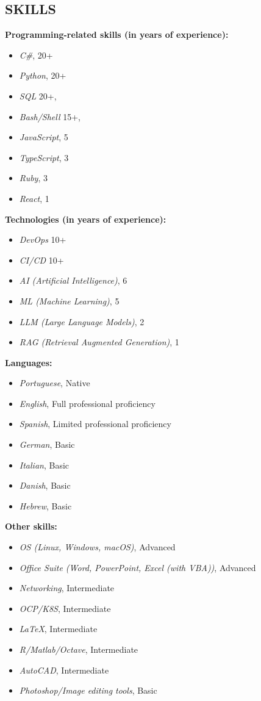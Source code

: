 \documentclass[margin]{res} %
\begin{document}
\begin{resume}
		\section{SKILLS}
		{\bf Programming-related skills (in years of experience):}
		\begin{itemize}
			\item {\sl C\#}, 20+
			\item {\sl Python}, 20+
			\item {\sl SQL} 20+,
			\item {\sl Bash/Shell} 15+,
			\item {\sl JavaScript}, 5
			\item {\sl TypeScript}, 3
			\item {\sl Ruby}, 3
			\item {\sl React}, 1
		\end{itemize}
		{\bf Technologies (in years of experience):}
		\begin{itemize}
			\item {\sl DevOps } 10+
			\item {\sl CI/CD } 10+
			\item {\sl AI (Artificial Intelligence)}, 6
			\item {\sl ML (Machine Learning)}, 5
			\item {\sl LLM (Large Language Models)}, 2
			\item {\sl RAG  (Retrieval Augmented Generation)}, 1
		\end{itemize}
		{\bf Languages:}
		\begin{itemize}
			\item {\sl Portuguese}, Native
			\item {\sl English}, Full professional proficiency
			\item {\sl Spanish}, Limited professional proficiency
			\item {\sl German}, Basic
			\item {\sl Italian}, Basic
			\item {\sl Danish}, Basic
			\item {\sl Hebrew}, Basic
		\end{itemize}
		{\bf Other skills:}
		\begin{itemize}
			\item {\sl OS (Linux, Windows, macOS)}, Advanced
			\item {\sl Office Suite (Word, PowerPoint, Excel (with VBA))}, Advanced
			\item {\sl Networking}, Intermediate
			\item {\sl OCP/K8S}, Intermediate
			\item {\sl \LaTeX}, Intermediate
			\item {\sl R/Matlab/Octave}, Intermediate
			\item {\sl AutoCAD}, Intermediate
			\item {\sl Photoshop/Image editing tools}, Basic
		\end{itemize}
		\hfill

\end{resume}
\end{document}
